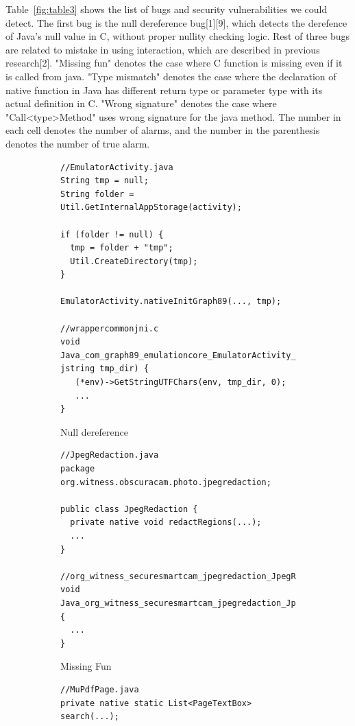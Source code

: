 Table~\ref{fig:table3} shows the list of bugs and security vulnerabilities we could detect.
The first bug is the null dereference bug[1][9], which detects the derefence of
Java's null value in C, without proper nullity checking logic. Rest of three
bugs are related to mistake in using interaction, which are described in
previous research[2]. "Missing fun" denotes the case where C function is
missing even if it is called from java. "Type mismatch" denotes the case where
the declaration of native function in Java has different return type or
parameter type with its actual definition in C.  "Wrong signature" denotes the
case where "Call<type>Method" uses wrong signature for the java method. The
number in each cell denotes the number of alarms, and the number in the
parenthesis denotes the number of true alarm.

\begin{figure}[t]
  \centering
  \vspace{2mm}
  \begin{subfigure}[t]{0.5\textwidth}
    \begin{lstlisting}[style=cpp,xleftmargin=2.5em]
//EmulatorActivity.java
String tmp = null;
String folder = Util.GetInternalAppStorage(activity);

if (folder != null) {
  tmp = folder + "tmp";
  Util.CreateDirectory(tmp);
}

EmulatorActivity.nativeInitGraph89(..., tmp);

//wrappercommonjni.c
void Java_com_graph89_emulationcore_EmulatorActivity_nativeInitGraph89(..., jstring tmp_dir) {
   (*env)->GetStringUTFChars(env, tmp_dir, 0);
   ...
}
    \end{lstlisting}
    \vspace*{-.5em}
    \caption{Null dereference}
    \label{fig:bug1}
  \end{subfigure}
  \begin{subfigure}[t]{0.5\textwidth}
    \begin{lstlisting}[style=cpp,xleftmargin=2.5em]
//JpegRedaction.java
package org.witness.obscuracam.photo.jpegredaction;

public class JpegRedaction {
  private native void redactRegions(...);
  ...
}

//org_witness_securesmartcam_jpegredaction_JpegRedaction.cpp
void Java_org_witness_securesmartcam_jpegredaction_JpegRedaction_redactRegions(...) {
  ...
}
    \end{lstlisting}
    \vspace*{-.5em}
    \caption{Missing Fun}
    \label{fig:bug2}
  \end{subfigure}
  \begin{subfigure}[t]{0.5\textwidth}
    \begin{lstlisting}[style=cpp,xleftmargin=2.5em]
//MuPdfPage.java
private native static List<PageTextBox> search(...);


\end{lstlisting}
\end{subfigure}
\end{figure}
